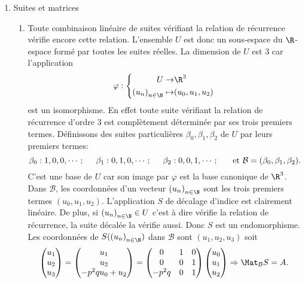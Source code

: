 \begin{enumerate}
\begin{enumerate}
\end{enumerate}
 
 \item Suites et matrices
\begin{enumerate}
 \item Toute combinaison linéaire de suites vérifiant la relation de récurrence vérifie encore cette relation. L'ensemble $U$ est donc un sous-espace du $\R$-espace formé par toutes les suites réelles. La dimension de $U$ est $3$ car l'application
 \begin{displaymath}
 \varphi : 
  \left\lbrace 
  \begin{aligned}
   U \rightarrow& \R^3 \\ \left( u_n \right)_{n \in \N} \mapsto& (u_0, u_1, u_2)
  \end{aligned}
\right. 
 \end{displaymath}
est un isomorphisme. En effet toute suite vérifiant la relation de récurrence d'ordre $3$ est complètement déterminée par ses trois premiers termes. Définissons des suites particulières $\beta_0, \beta_1, \beta_2$ de $U$ par leurs premiers termes:
\begin{displaymath}
 \beta_0 : 1, 0, 0, \cdots; \hspace{0.5cm} \beta_1 : 0, 1, 0, \cdots; \hspace{0.5cm} \beta_2 : 0, 0, 1, \cdots; \hspace{0.5cm} \text{ et } \mathcal{B} = (\beta_0, \beta_1, \beta_2).
\end{displaymath}
C'est une base de $U$ car son image par $\varphi$ est la base canonique de $\R^3$. Dans $\mathcal{B}$, les coordonnées d'un vecteur $\left( u_n \right)_{n \in \N}$ sont les trois premiers termes $(u_0, u_1, u_2)$.\newline
L'application $S$ de décalage d'indice est clairement linéaire. De plus, si $\left( u_n \right)_{n \in \N}\in U$ c'est à dire vérifie la relation de récurrence, la suite décalée la vérifie aussi. Donc $S$ est un endomorphisme.\newline
Les coordonnées de $S(\left( u_n \right)_{n \in \N})$ dans $\mathcal{B}$ sont $(u_1, u_2, u_3)$ soit 
\begin{displaymath}
\begin{pmatrix}
 u_1 \\ u_2 \\ u_3
\end{pmatrix}
=
\begin{pmatrix}
 u_1 \\ u_2 \\ -p^2q u_0 + u_2
\end{pmatrix}
= 
\begin{pmatrix}
 0 & 1 & 0 \\ 0 & 0 & 1 \\ -p^2q & 0 & 1
\end{pmatrix}
 \begin{pmatrix}
 u_0 \\ u_1 \\ u_2
\end{pmatrix} \Rightarrow \Mat_{\mathcal{B}}S = A.
\end{displaymath}


\end{enumerate}
\end{enumerate}
